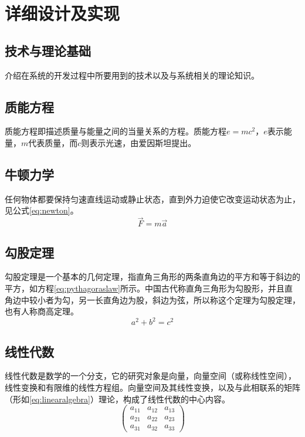 
\chapter{详细设计及实现}

\section{技术与理论基础}
介绍在系统的开发过程中所要用到的技术\cite{timmurphy}以及与系统相关的理论知识\cite{huwei2017latex2e}。

\section{质能方程}
质能方程即描述质量与能量之间的当量关系的方程\cite{liuxiaopingwordandtex}。质能方程$e=mc^2$，$e$表示能量，$m$代表质量，而$c$则表示光速，由爱因斯坦提出\cite{yassin1994latex}。

\section{牛顿力学}
任何物体都要保持匀速直线运动或静止状态\cite{liu2013latex}，直到外力迫使它改变运动状态为止，见公式\eqref{eq:newton}。
\begin{equation}\label{eq:newton}
	\vec{F}=m\vec{a} 
\end{equation}

\section{勾股定理}
勾股定理是一个基本的几何定理，指直角三角形的两条直角边的平方和等于斜边的平方，如方程\eqref{eq:pythagoraslaw}所示。中国古代称直角三角形为勾股形，并且直角边中较小者为勾，另一长直角边为股，斜边为弦，所以称这个定理为勾股定理，也有人称商高定理\cite{he2017mask}。
\begin{equation}\label{eq:pythagoraslaw}
    a^2 + b^2 = c^2  
\end{equation}

\section{线性代数}
线性代数是数学的一个分支，它的研究对象是向量，向量空间（或称线性空间），线性变换和有限维的线性方程组。向量空间及其线性变换，以及与此相联系的矩阵（形如\eqref{eq:linearalgebra}）理论，构成了线性代数的中心内容。
\begin{equation}\label{eq:linearalgebra}
	\begin{pmatrix}
		a_{11} & a_{12} & a_{13}\\ 
		a_{21} & a_{22} & a_{23}\\  
		a_{31} & a_{32} & a_{33}   
	\end{pmatrix}  
\end{equation}

